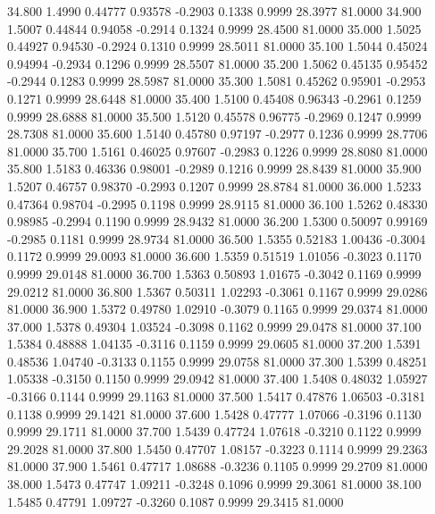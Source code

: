   34.800   1.4990   0.44777   0.93578  -0.2903   0.1338   0.9999  28.3977  81.0000
  34.900   1.5007   0.44844   0.94058  -0.2914   0.1324   0.9999  28.4500  81.0000
  35.000   1.5025   0.44927   0.94530  -0.2924   0.1310   0.9999  28.5011  81.0000
  35.100   1.5044   0.45024   0.94994  -0.2934   0.1296   0.9999  28.5507  81.0000
  35.200   1.5062   0.45135   0.95452  -0.2944   0.1283   0.9999  28.5987  81.0000
  35.300   1.5081   0.45262   0.95901  -0.2953   0.1271   0.9999  28.6448  81.0000
  35.400   1.5100   0.45408   0.96343  -0.2961   0.1259   0.9999  28.6888  81.0000
  35.500   1.5120   0.45578   0.96775  -0.2969   0.1247   0.9999  28.7308  81.0000
  35.600   1.5140   0.45780   0.97197  -0.2977   0.1236   0.9999  28.7706  81.0000
  35.700   1.5161   0.46025   0.97607  -0.2983   0.1226   0.9999  28.8080  81.0000
  35.800   1.5183   0.46336   0.98001  -0.2989   0.1216   0.9999  28.8439  81.0000
  35.900   1.5207   0.46757   0.98370  -0.2993   0.1207   0.9999  28.8784  81.0000
  36.000   1.5233   0.47364   0.98704  -0.2995   0.1198   0.9999  28.9115  81.0000
  36.100   1.5262   0.48330   0.98985  -0.2994   0.1190   0.9999  28.9432  81.0000
  36.200   1.5300   0.50097   0.99169  -0.2985   0.1181   0.9999  28.9734  81.0000
  36.500   1.5355   0.52183   1.00436  -0.3004   0.1172   0.9999  29.0093  81.0000
  36.600   1.5359   0.51519   1.01056  -0.3023   0.1170   0.9999  29.0148  81.0000
  36.700   1.5363   0.50893   1.01675  -0.3042   0.1169   0.9999  29.0212  81.0000
  36.800   1.5367   0.50311   1.02293  -0.3061   0.1167   0.9999  29.0286  81.0000
  36.900   1.5372   0.49780   1.02910  -0.3079   0.1165   0.9999  29.0374  81.0000
  37.000   1.5378   0.49304   1.03524  -0.3098   0.1162   0.9999  29.0478  81.0000
  37.100   1.5384   0.48888   1.04135  -0.3116   0.1159   0.9999  29.0605  81.0000
  37.200   1.5391   0.48536   1.04740  -0.3133   0.1155   0.9999  29.0758  81.0000
  37.300   1.5399   0.48251   1.05338  -0.3150   0.1150   0.9999  29.0942  81.0000
  37.400   1.5408   0.48032   1.05927  -0.3166   0.1144   0.9999  29.1163  81.0000
  37.500   1.5417   0.47876   1.06503  -0.3181   0.1138   0.9999  29.1421  81.0000
  37.600   1.5428   0.47777   1.07066  -0.3196   0.1130   0.9999  29.1711  81.0000
  37.700   1.5439   0.47724   1.07618  -0.3210   0.1122   0.9999  29.2028  81.0000
  37.800   1.5450   0.47707   1.08157  -0.3223   0.1114   0.9999  29.2363  81.0000
  37.900   1.5461   0.47717   1.08688  -0.3236   0.1105   0.9999  29.2709  81.0000
  38.000   1.5473   0.47747   1.09211  -0.3248   0.1096   0.9999  29.3061  81.0000
  38.100   1.5485   0.47791   1.09727  -0.3260   0.1087   0.9999  29.3415  81.0000
